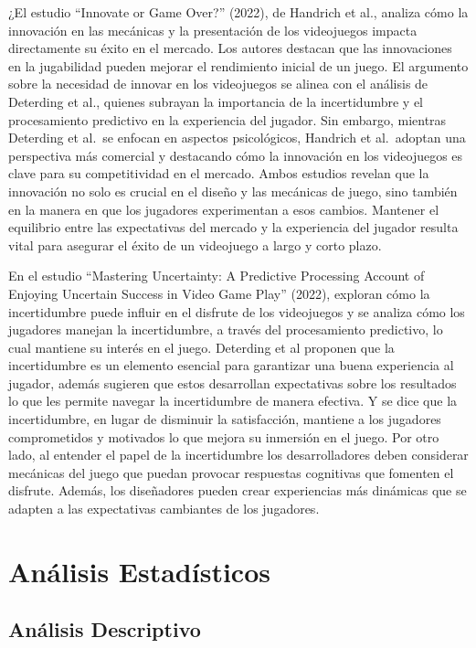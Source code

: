 \documentclass[
  letterpaper,
  DIV=11,
  numbers=noendperiod]{scrreprt}
\begin{document}
¿El estudio ``Innovate or Game Over?'' (2022), de Handrich et al.,
analiza cómo la innovación en las mecánicas y la presentación de los
videojuegos impacta directamente su éxito en el mercado. Los autores
destacan que las innovaciones en la jugabilidad pueden mejorar el
rendimiento inicial de un juego. El argumento sobre la necesidad de
innovar en los videojuegos se alinea con el análisis de Deterding et
al., quienes subrayan la importancia de la incertidumbre y el
procesamiento predictivo en la experiencia del jugador. Sin embargo,
mientras Deterding et al.~se enfocan en aspectos psicológicos, Handrich
et al.~adoptan una perspectiva más comercial y destacando cómo la
innovación en los videojuegos es clave para su competitividad en el
mercado. Ambos estudios revelan que la innovación no solo es crucial en
el diseño y las mecánicas de juego, sino también en la manera en que los
jugadores experimentan a esos cambios. Mantener el equilibrio entre las
expectativas del mercado y la experiencia del jugador resulta vital para
asegurar el éxito de un videojuego a largo y corto plazo.

En el estudio ``Mastering Uncertainty: A Predictive Processing Account
of Enjoying Uncertain Success in Video Game Play'' (2022), exploran cómo
la incertidumbre puede influir en el disfrute de los videojuegos y se
analiza cómo los jugadores manejan la incertidumbre, a través del
procesamiento predictivo, lo cual mantiene su interés en el juego.
Deterding et al proponen que la incertidumbre es un elemento esencial
para garantizar una buena experiencia al jugador, además sugieren que
estos desarrollan expectativas sobre los resultados lo que les permite
navegar la incertidumbre de manera efectiva. Y se dice que la
incertidumbre, en lugar de disminuir la satisfacción, mantiene a los
jugadores comprometidos y motivados lo que mejora su inmersión en el
juego. Por otro lado, al entender el papel de la incertidumbre los
desarrolladores deben considerar mecánicas del juego que puedan provocar
respuestas cognitivas que fomenten el disfrute. Además, los diseñadores
pueden crear experiencias más dinámicas que se adapten a las
expectativas cambiantes de los jugadores.


\chapter{Análisis Estadísticos}\label{anuxe1lisis-estaduxedsticos}

\section{Análisis Descriptivo}\label{anuxe1lisis-descriptivo}
\end{document}
